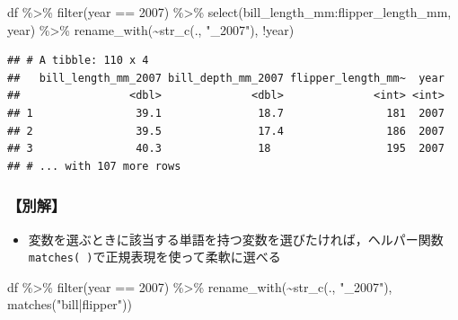 \documentclass[
  xelatex,ja=standard, b5paper]{bxjsbook}
\newenvironment{Shaded}{\begin{snugshade}}{\end{snugshade}}
\newcommand{\DecValTok}[1]{\textcolor[rgb]{0.00,0.00,0.81}{#1}}
\newcommand{\FunctionTok}[1]{\textcolor[rgb]{0.00,0.00,0.00}{#1}}
\newcommand{\NormalTok}[1]{#1}
\newcommand{\SpecialCharTok}[1]{\textcolor[rgb]{0.00,0.00,0.00}{#1}}
\newcommand{\StringTok}[1]{\textcolor[rgb]{0.31,0.60,0.02}{#1}}
\providecommand{\tightlist}{%
  \setlength{\itemsep}{0pt}\setlength{\parskip}{0pt}}
\begin{document}
\begin{Shaded}
\begin{Highlighting}[]
\NormalTok{df }\SpecialCharTok{\%\textgreater{}\%} 
  \FunctionTok{filter}\NormalTok{(year }\SpecialCharTok{==} \DecValTok{2007}\NormalTok{) }\SpecialCharTok{\%\textgreater{}\%} 
  \FunctionTok{select}\NormalTok{(bill\_length\_mm}\SpecialCharTok{:}\NormalTok{flipper\_length\_mm, year) }\SpecialCharTok{\%\textgreater{}\%} 
  \FunctionTok{rename\_with}\NormalTok{(}\SpecialCharTok{\textasciitilde{}}\FunctionTok{str\_c}\NormalTok{(., }\StringTok{"\_2007"}\NormalTok{),}
               \SpecialCharTok{!}\NormalTok{year)}
\end{Highlighting}
\end{Shaded}

\begin{verbatim}
## # A tibble: 110 x 4
##   bill_length_mm_2007 bill_depth_mm_2007 flipper_length_mm~  year
##                 <dbl>              <dbl>              <int> <int>
## 1                39.1               18.7                181  2007
## 2                39.5               17.4                186  2007
## 3                40.3               18                  195  2007
## # ... with 107 more rows
\end{verbatim}

\hypertarget{rename-strc-other}{%
\subsubsection{【別解】}\label{rename-strc-other}}

\begin{itemize}
\tightlist
\item
  変数を選ぶときに該当する単語を持つ変数を選びたければ，ヘルパー関数\texttt{matches(\ )}で正規表現を使って柔軟に選べる
\end{itemize}

\begin{Shaded}
\begin{Highlighting}[]
\NormalTok{df }\SpecialCharTok{\%\textgreater{}\%} 
\FunctionTok{filter}\NormalTok{(year }\SpecialCharTok{==} \DecValTok{2007}\NormalTok{) }\SpecialCharTok{\%\textgreater{}\%} 
  \FunctionTok{rename\_with}\NormalTok{(}\SpecialCharTok{\textasciitilde{}}\FunctionTok{str\_c}\NormalTok{(., }\StringTok{"\_2007"}\NormalTok{),}
               \FunctionTok{matches}\NormalTok{(}\StringTok{"bill|flipper"}\NormalTok{))}
\end{Highlighting}
\end{Shaded}
\end{document}
